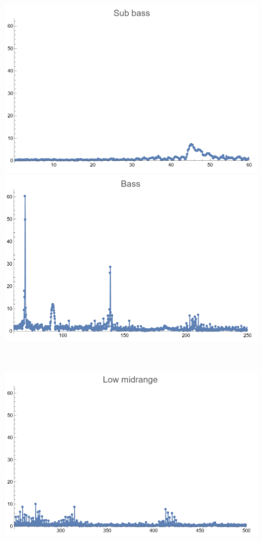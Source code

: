 \documentclass[12pt, letterpaper]{article}
\begin{document}
\begin{figure}[H]
  \centering
  \begin{minipage}{.3\textwidth}
    \centering
    \includegraphics[width=.9\linewidth]{imgs/Cancion9/subbass.png}
  \end{minipage}
  \begin{minipage}{0.03\textwidth}\end{minipage}
  \begin{minipage}{.3\textwidth}
    \centering
    \includegraphics[width=.9\linewidth]{imgs/Cancion9/bass.png}
  \end{minipage} \medskip \\
  \begin{minipage}{.3\textwidth}
    \centering
    \includegraphics[width=.9\linewidth]{imgs/Cancion9/lowmid.png}

\end{minipage}
\end{figure}
\end{document}
